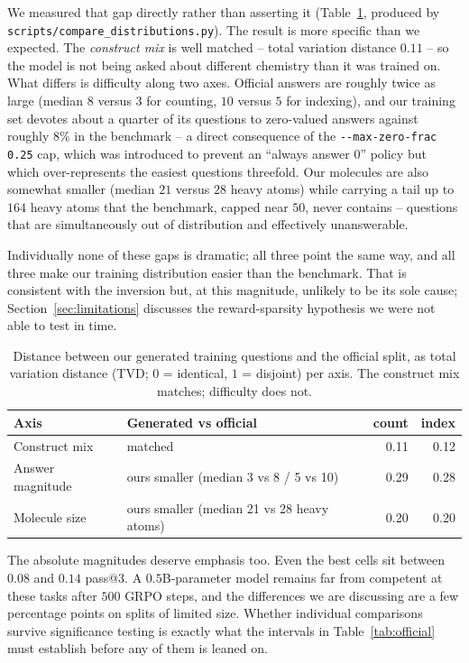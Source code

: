 \documentclass[a4paper,oneside,10pt,ngerman,english]{scrartcl}
\begin{document}
We measured that gap directly rather than asserting it
(Table~\ref{tab:distgap}, produced by \texttt{scripts/compare\_distributions.py}).
The result is more specific than we expected. The \emph{construct mix} is well
matched -- total variation distance $0.11$ -- so the model is not being asked
about different chemistry than it was trained on. What differs is difficulty
along two axes. Official answers are roughly twice as large (median $8$ versus
$3$ for counting, $10$ versus $5$ for indexing), and our training set devotes
about a quarter of its questions to zero-valued answers against roughly $8\%$ in
the benchmark -- a direct consequence of the \texttt{-{}-max-zero-frac 0.25} cap,
which was introduced to prevent an ``always answer 0'' policy but which
over-represents the easiest questions threefold. Our molecules are also somewhat
smaller (median $21$ versus $28$ heavy atoms) while carrying a tail up to $164$
heavy atoms that the benchmark, capped near $50$, never contains -- questions
that are simultaneously out of distribution and effectively unanswerable.

Individually none of these gaps is dramatic; all three point the same way, and
all three make our training distribution easier than the benchmark. That is
consistent with the inversion but, at this magnitude, unlikely to be its sole
cause; Section~\ref{sec:limitations} discusses the reward-sparsity hypothesis we
were not able to test in time.

\begin{table}[!b]
\centering
\caption{%
    Distance between our generated training questions and the official split,
    as total variation distance (TVD; $0$ = identical, $1$ = disjoint) per axis.
    The construct mix matches; difficulty does not.
}\label{tab:distgap}
\small
\begin{tabularx}{\linewidth}{lXrr}
\toprule
\textbf{Axis} & \textbf{Generated vs official} & \textbf{count} & \textbf{index} \\
\midrule
Construct mix     & matched                                  & 0.11 & 0.12 \\
Answer magnitude  & ours smaller (median 3 vs 8 / 5 vs 10)   & 0.29 & 0.28 \\
Molecule size     & ours smaller (median 21 vs 28 heavy atoms) & 0.20 & 0.20 \\
\bottomrule
\end{tabularx}
\end{table}

The absolute magnitudes deserve emphasis too. Even the best cells sit between
$0.08$ and $0.14$ pass@3. A $0.5$B-parameter model remains far from competent at
these tasks after $500$ GRPO steps, and the differences we are discussing are a
few percentage points on splits of limited size. Whether individual comparisons
survive significance testing is exactly what the intervals in
Table~\ref{tab:official} must establish before any of them is leaned on.
\end{document}
